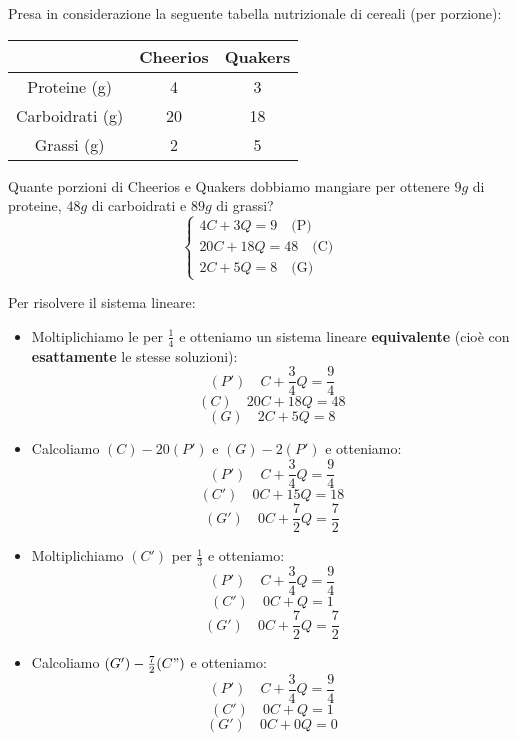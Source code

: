 \documentclass[a4paper]{article}
\theoremstyle{break}
\theoremstyle{break}
\theoremstyle{break}
\theoremstyle{break}
\begin{document}
\begin{example}
	Presa in considerazione la seguente tabella nutrizionale di cereali (per porzione):
	\begin{center}
		\begin{tabular}{c|c|c}
			                & Cheerios & Quakers \\
			\hline
			Proteine (g)    & 4        & 3       \\
			Carboidrati (g) & 20       & 18      \\
			Grassi (g)      & 2        & 5       \\
		\end{tabular}
	\end{center}
	Quante porzioni di Cheerios e Quakers dobbiamo mangiare per ottenere \( 9g \) di
	proteine, \( 48g \) di carboidrati e \( 89g \) di grassi?
	\[
		\begin{cases}
			4C + 3Q = 9 \quad \text{(P)}    \\
			20C + 18Q = 48 \quad \text{(C)} \\
			2C + 5Q = 8 \quad \text{(G)}
		\end{cases}
	\]

	Per risolvere il sistema lineare:
	\begin{itemize}
		\item
		      Moltiplichiamo le per \( \frac{1}{4} \)
		      e otteniamo un sistema lineare \textbf{equivalente} (cioè con
		      \textbf{esattamente} le stesse soluzioni):
		      \[
			      (P') \quad C + \frac{3}{4}Q = \frac{9}{4}
		      \]
		      \[
			      (C) \quad 20C + 18Q = 48
		      \]
		      \[
			      (G) \quad 2C + 5Q = 8
		      \]
		\item Calcoliamo \( (C)-20(P') \) e \( (G)-2(P') \) e otteniamo:
		      \[
			      (P') \quad C + \frac{3}{4}Q = \frac{9}{4}
		      \]
		      \[
			      (C') \quad 0C + 15Q = 18
		      \]
		      \[
			      (G') \quad 0C + \frac{7}{2}Q = \frac{7}{2}
		      \]
		\item Moltiplichiamo \( (C') \) per \( \frac{1}{3} \) e otteniamo:
		      \[
			      (P') \quad C + \frac{3}{4}Q = \frac{9}{4}
		      \]
		      \[
			      (C') \quad 0C + Q = 1
		      \]
		      \[
			      (G') \quad 0C + \frac{7}{2}Q = \frac{7}{2}
		      \]
		\item Calcoliamo \( (G') - \frac{7}{2} (C") \) e otteniamo:
		      \[
			      (P') \quad C + \frac{3}{4}Q = \frac{9}{4}
		      \]
		      \[
			      (C') \quad 0C + Q = 1
		      \]
		      \[
			      (G') \quad 0C + 0Q = 0
		      \]
	\end{itemize}


\end{example}
\end{document}
